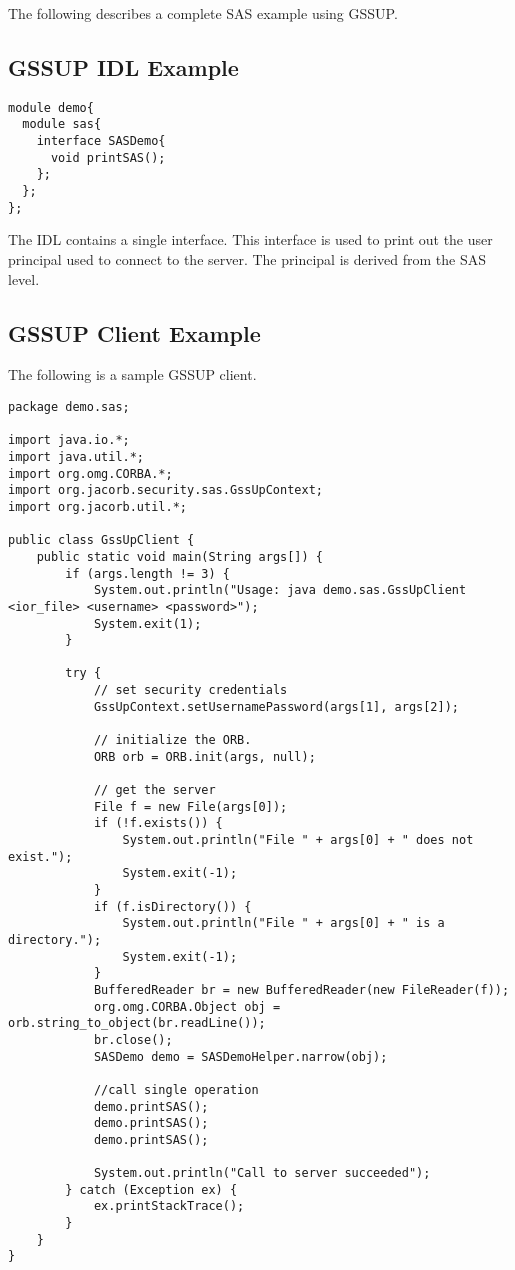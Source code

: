 The following describes a complete SAS example using GSSUP.

\subsection{GSSUP IDL Example}

\begin{scriptsize}
\begin{verbatim}
module demo{
  module sas{
    interface SASDemo{
      void printSAS();
    };
  };
};
\end{verbatim}
\end{scriptsize}

The IDL contains a single interface. This interface is used to print out
the user principal used to connect to the server. The principal is derived
from the SAS level.

\subsection{GSSUP Client Example}

The following is a sample GSSUP client.

\begin{scriptsize}
\begin{verbatim}
package demo.sas;

import java.io.*;
import java.util.*;
import org.omg.CORBA.*;
import org.jacorb.security.sas.GssUpContext;
import org.jacorb.util.*;

public class GssUpClient {
    public static void main(String args[]) {
        if (args.length != 3) {
            System.out.println("Usage: java demo.sas.GssUpClient <ior_file> <username> <password>");
            System.exit(1);
        }

        try {
            // set security credentials
            GssUpContext.setUsernamePassword(args[1], args[2]);

            // initialize the ORB.
            ORB orb = ORB.init(args, null);

            // get the server
            File f = new File(args[0]);
            if (!f.exists()) {
                System.out.println("File " + args[0] + " does not exist.");
                System.exit(-1);
            }
            if (f.isDirectory()) {
                System.out.println("File " + args[0] + " is a directory.");
                System.exit(-1);
            }
            BufferedReader br = new BufferedReader(new FileReader(f));
            org.omg.CORBA.Object obj = orb.string_to_object(br.readLine());
            br.close();
            SASDemo demo = SASDemoHelper.narrow(obj);

            //call single operation
            demo.printSAS();
            demo.printSAS();
            demo.printSAS();

            System.out.println("Call to server succeeded");
        } catch (Exception ex) {
            ex.printStackTrace();
        }
    }
}
\end{verbatim}
\end{scriptsize}

